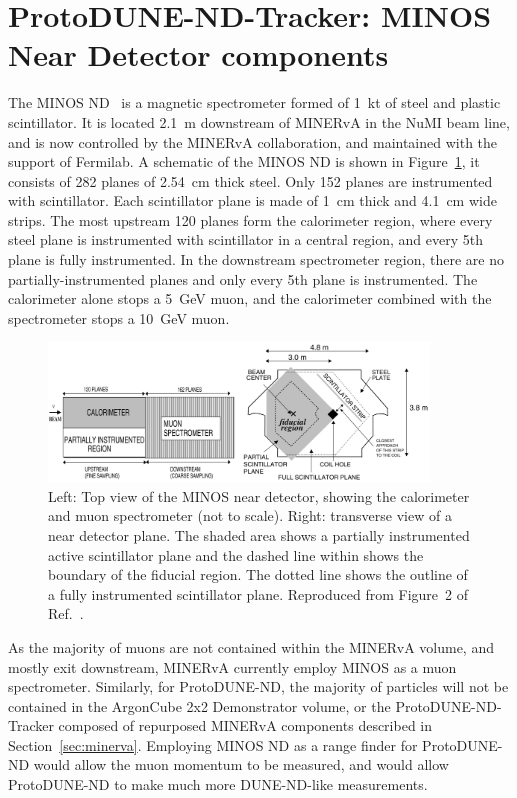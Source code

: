 \section{ProtoDUNE-ND-Tracker: MINOS Near Detector components}
\label{sec:MINOS}

The MINOS ND~\cite{MINOS_NIM} is a magnetic spectrometer formed of \SI{1}{\kilo\tonne} of steel and plastic scintillator. It is located \SI{2.1}{\metre} downstream of MINERvA in the NuMI beam line, and is now controlled by the MINERvA collaboration, and maintained with the support of Fermilab. A schematic of the MINOS ND is shown in Figure~\ref{fig:minos_near_detector}, it consists of 282 planes of \SI{2.54}{\centi\metre} thick steel. Only 152 planes are instrumented with scintillator. Each scintillator plane is made of \SI{1}{\centi\metre} thick  and \SI{4.1}{\centi\metre} wide strips. The most upstream 120 planes form the calorimeter region, where every steel plane is instrumented with scintillator in a central region, and every 5th plane is fully instrumented. In the downstream spectrometer region, there are no partially-instrumented planes and only every 5th plane is instrumented. The calorimeter alone stops a 5~GeV muon, and the calorimeter combined with the spectrometer stops a 10~GeV muon.

\begin{figure}[htb]
  \centering
  \includegraphics[width=0.9\textwidth]{plots/minos.png}
  \caption{Left: Top view of the MINOS near detector, showing the calorimeter and muon spectrometer (not to scale). Right: transverse view of a near detector plane. The shaded area shows a partially instrumented active scintillator plane and the dashed line within shows the boundary of the fiducial region. The dotted line shows the outline of a fully instrumented scintillator plane. Reproduced from Figure~2 of Ref.~\cite{MINOSDetectors}.}
  \label{fig:minos_near_detector}
\end{figure}

As the majority of muons are not contained within the MINERvA volume, and mostly exit downstream, MINERvA currently employ MINOS as a muon spectrometer. Similarly, for ProtoDUNE-ND, the majority of particles will not be contained in the ArgonCube 2x2 Demonstrator volume, or the ProtoDUNE-ND-Tracker composed of repurposed MINERvA components described in Section~\ref{sec:minerva}. Employing MINOS ND as a range finder for ProtoDUNE-ND would allow the muon momentum to be measured, and would allow ProtoDUNE-ND to make much more DUNE-ND-like measurements. 

